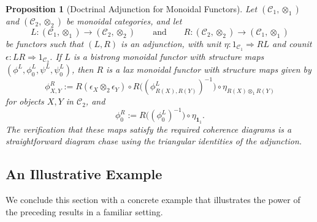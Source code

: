 \documentclass{amsart}
\newtheorem{proposition}{Proposition}[section]
\begin{document}
\begin{proposition}[Doctrinal Adjunction for Monoidal Functors]\label{prop:adjunction_monoidal}
Let $(\mathcal{C}_1, \otimes_1)$ and $(\mathcal{C}_2, \otimes_2)$ be monoidal categories, and let
\[
L \colon (\mathcal{C}_1, \otimes_1) \longrightarrow (\mathcal{C}_2, \otimes_2)
\qquad\text{and}\qquad
R \colon (\mathcal{C}_2, \otimes_2) \longrightarrow (\mathcal{C}_1, \otimes_1)
\]
be functors such that $(L, R)$ is an adjunction, with unit $\eta \colon 1_{\mathcal{C}_1} \Rightarrow R L$ and counit $\epsilon \colon L R \Rightarrow 1_{\mathcal{C}_2}$. If $L$ is a bistrong monoidal functor with structure maps $(\phi^L, \phi_0^L, \psi^L, \psi_0^L)$, then $R$ is a lax monoidal functor with structure maps given by
\[
\phi^R_{X,Y} := R(\epsilon_X \otimes_2 \epsilon_Y) \circ R\bigl((\phi^L_{R(X), R(Y)})^{-1}\bigr) \circ \eta_{R(X) \otimes_1 R(Y)}
\]
for objects $X, Y$ in $\mathcal{C}_2$, and
\[
\phi^R_0 := R\bigl((\phi_0^L)^{-1}\bigr) \circ \eta_{\mathbf{1}_1}.
\]
The verification that these maps satisfy the required coherence diagrams is a straightforward diagram chase using the triangular identities of the adjunction.
\end{proposition}

\subsection{An Illustrative Example}

We conclude this section with a concrete example that illustrates the power of the preceding results in a familiar setting.
\end{document}
